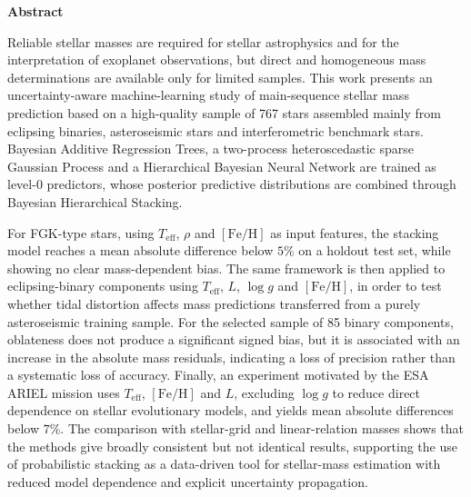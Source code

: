\def\BayeStarMLMainFile{}





\newpage

\begingroup
\setlength{\parindent}{0pt}
{\small
{}
    \begin{center}
        \large\bfseries Abstract
    \end{center}
    Reliable stellar masses are required for stellar astrophysics and for the interpretation of exoplanet observations, but direct and homogeneous mass determinations are available only for limited samples. This work presents an uncertainty-aware machine-learning study of main-sequence stellar mass prediction based on a high-quality sample of 767 stars assembled mainly from eclipsing binaries, asteroseismic stars and interferometric benchmark stars. Bayesian Additive Regression Trees, a two-process heteroscedastic sparse Gaussian Process and a Hierarchical Bayesian Neural Network are trained as level-0 predictors, whose posterior predictive distributions are combined through Bayesian Hierarchical Stacking.

    \par\smallskip
    For FGK-type stars, using $T_{\mathrm{eff}}$, $\rho$ and $[\mathrm{Fe}/\mathrm{H}]$ as input features, the stacking model reaches a mean absolute difference below $5\%$ on a holdout test set, while showing no clear mass-dependent bias. The same framework is then applied to eclipsing-binary components using $T_{\mathrm{eff}}$, $L$, $\log g$ and $[\mathrm{Fe}/\mathrm{H}]$, in order to test whether tidal distortion affects mass predictions transferred from a purely asteroseismic training sample. For the selected sample of 85 binary components, oblateness does not produce a significant signed bias, but it is associated with an increase in the absolute mass residuals, indicating a loss of precision rather than a systematic loss of accuracy. Finally, an experiment motivated by the ESA ARIEL mission uses $T_{\mathrm{eff}}$, $[\mathrm{Fe}/\mathrm{H}]$ and $L$, excluding $\log g$ to reduce direct dependence on stellar evolutionary models, and yields mean absolute differences below $7\%$. The comparison with stellar-grid and linear-relation masses shows that the methods give broadly consistent but not identical results, supporting the use of probabilistic stacking as a data-driven tool for stellar-mass estimation with reduced model dependence and explicit uncertainty propagation.

}
